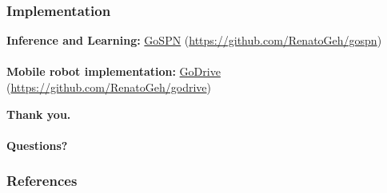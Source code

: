 \documentclass{beamer}
\begin{document}
\begin{frame}
  \frametitle{Implementation}
  \centering
  \large\textbf{Inference and Learning:} \href{https://github.com/RenatoGeh/gospn}{GoSPN}
  (\url{https://github.com/RenatoGeh/gospn})\\~\\

  \textbf{Mobile robot implementation:} \href{https://github.com/RenatoGeh/godrive}{GoDrive}
  (\url{https://github.com/RenatoGeh/godrive})

\end{frame}

\begin{frame}[standout]
  \textbf{Thank you.\\~\\Questions?}
\end{frame}

\begin{frame}[t,allowframebreaks]
  \frametitle{References}
  \printbibliography[heading=none]
\end{frame}
\end{document}
